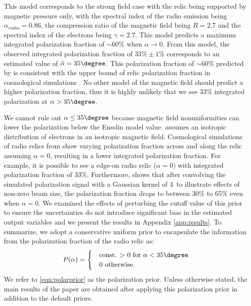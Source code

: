 This model corresponds to the strong field case with the relic being supported by
magnetic pressure only, with the spectral index of the radio
emission being $\alpha_{radio} = 0.86$, the compression ratio of the
magnetic field being
$R=2.7$ and the spectral index of the electrons being $\gamma = 2.7$. 
This model predicts a maximum integrated polarization fraction of
$\sim60\%$ when $\alpha \rightarrow 0$. From this model, the observed integrated
polarization fraction of $33\%\pm1\%$ corresponds to an estimated value
of $\hat{\alpha}
 = 35\degree$. 
This  polarization fraction of $\sim60\%$ predicted by \citep{E98} is
consistent with the upper bound of relic polarization fraction in cosmological
simulations \citep{S13}. No other model of the magnetic field should predict 
a higher polarization fraction, thus it is highly unlikely that we see 33\%
integrated polarization at $\alpha > 35\degree$.  
\par

We cannot rule out $\alpha \leq 35\degree$ because magnetic field
nonuniformities can lower the polarization below the Ensslin model value.
\cite{E98} assumes an isotropic distribution of electrons in an isotropic magnetic field. Cosmological
simulations of radio relics from \cite{S13} show varying polarization
fraction across and along the relic assuming $\alpha = 0$, resulting in a
lower integrated polarization fraction. For example, it is possible to see 
a edge-on radio relic ($\alpha = 0$) with integrated polarization fraction of 33\%. 
Furthermore, \cite{S13} shows that after convolving the
simulated polarization signal with a Gaussian kernel of 4\arcmin~to
illustrate effects of non-zero beam size, the polarization fraction drops to between 30\% to
65\% even when $\alpha = 0$. We examined the effects of perturbing
the cutoff value of this prior to ensure the uncertainties do not
introduce significant bias in the estimated output variables and we
present the results in Appendix \ref{app:results}.
To summarize, we adopt a conservative uniform prior to encapsulate the
information from the polarization fraction of the radio relic as:
\begin{equation}
P(\alpha) = 
	\begin{cases}
	& \text{const. $>$ 0 for  }\alpha < 35 \degree \\ 
	& 0 \text{ otherwise}\label{eqn:polarprior}.
	\end{cases}
\end{equation}
We refer to \ref{eqn:polarprior} as the polarization prior. Unless
otherwise stated, the main results of the paper are obtained after applying
this polarization prior in addition to the default priors.

